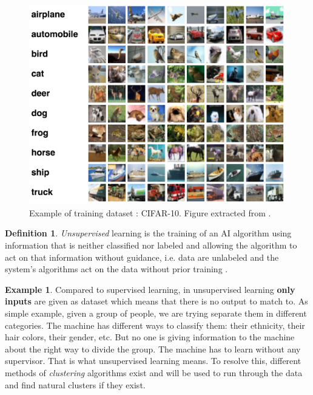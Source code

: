 \documentclass[11pt, openany]{report}
\theoremstyle{plain}
\theoremstyle{definition}
\newtheorem{defn}{Definition}[section]
\newtheorem{exmp}{Example}[section]
\theoremstyle{remark}
\begin{document}
\begin{figure}[h]
  \centering
  \includegraphics[scale=0.25]{figures/cifar10.png}
  \caption{Example of training dataset : CIFAR-10. Figure extracted from \cite{CIFAR10}.}
  \label{fig:cifar10}
\end{figure}

\begin{defn}
\textit{Unsupervised} learning is the training of an AI algorithm using information that is neither classified nor labeled and allowing the algorithm to act on that information without guidance, i.e. data are unlabeled and the system’s algorithms act on the data without prior training \cite{Unsupervised-1}. 
\end{defn}

\begin{exmp}
Compared to supervised learning, in unsupervised learning \textbf{only inputs} are given as dataset which means that there is no output to match to. As simple example, given a group of people, we are trying separate them in different categories. The machine has different ways to classify them: their ethnicity, their hair colors, their gender, etc. But no one is giving information to the machine about the right way to divide the group. The machine has to learn without any supervisor. That is what unsupervised learning means.   To resolve this, different methods of \textit{clustering} algorithms exist and will be used to run through the data and find natural clusters if they exist. %

\end{exmp}    
\end{document}
